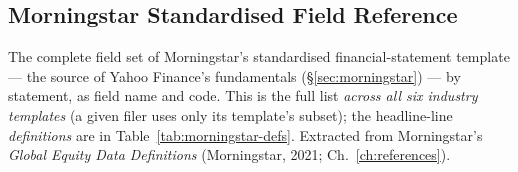 \documentclass[11pt,a4paper]{report}
\begin{document}
\begin{subappendices}
\section{Morningstar Standardised Field Reference}
\label{ch:morningstar-fields}

\noindent The complete field set of Morningstar's standardised financial-statement template --- the source of
Yahoo Finance's fundamentals (\S\ref{sec:morningstar}) --- by statement, as field name and code. This is the
full list \emph{across all six industry templates} (a given filer uses only its template's subset); the
headline-line \emph{definitions} are in Table~\ref{tab:morningstar-defs}. Extracted from Morningstar's
\emph{Global Equity Data Definitions} (Morningstar, 2021; Ch.~\ref{ch:references}).


\end{subappendices}
\end{document}
